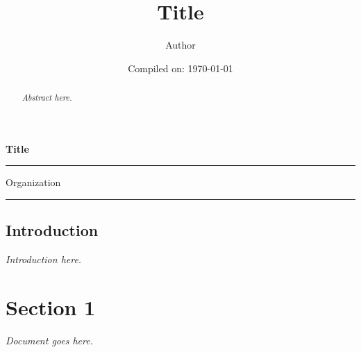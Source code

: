 \documentclass[11pt]{article}
\title{\textbf{Title}}
\author{Author}
\date{Compiled on: \today}
\begin{document}
\newcommand{\makecover}{
\begin{flushleft}
    \huge\bfseries Title
\end{flushleft}
    \rule{\linewidth}{5pt} %
    \begin{flushright}
            \thedate
    \end{flushright}




\vfill
\begin{flushleft}
\Large \bfseries{\theauthor}

\Large{Organization}
\end{flushleft}
    \rule{\linewidth}{5pt}
\pagebreak
}
\makecover
\maketitle
{}
\setcounter{section}{0}

\begin{abstract}
        \emph{Abstract here.}
\end{abstract}

\subsection*{Introduction}
\emph{Introduction here.}

\newpage

\tableofcontents



\newpage
{}
\section{Section 1}
\emph{Document goes here.}
\end{document}
